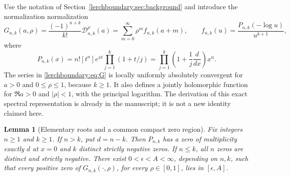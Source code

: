 \documentclass[11pt,a4paper]{article}
\newtheorem{lemma}[theorem]{Lemma}
\theoremstyle{definition}
\theoremstyle{remark}
\numberwithin{equation}{section}
\begin{document}
Use the notation of Section~\ref{lerchboundary:sec:background} and introduce the
normalization
normalization
\begin{equation}\label{lerchboundary:eq:G}
 G_{n,k}(a,\rho)=\frac{(-1)^{n+k}}{k!}\mathcal D_{n,k}^{\rho}(a)
 =\sum_{m=0}^{\infty}\rho^m f_{n,k}(a+m),\qquad
 f_{n,k}(u)=\frac{P_{n,k}(-\log u)}{u^{k+1}},
\end{equation}
where
\begin{equation}\label{lerchboundary:eq:P}
 P_{n,k}(x)=n![t^n]e^{xt}\prod_{j=1}^k(1+t/j)
 =\prod_{j=1}^k\left(1+\frac1j\frac{d}{dx}\right)x^n.
\end{equation}
The series in \eqref{lerchboundary:eq:G} is locally uniformly absolutely
convergent for $a>0$ and $0\leq\rho\leq1$, because $k\geq1$.
It also defines a jointly holomorphic function for $\Re a>0$ and
$|\rho|<1$, with the principal logarithm. The derivation of this exact
spectral representation is already in the manuscript; it is not a new
identity claimed here.

\begin{lemma}[Elementary roots and a common compact zero region]
\label{lerchboundary:lem:roots}
Fix integers $n\geq1$ and $k\geq1$.
If $n>k$, put $d=n-k$. Then $P_{n,k}$ has a zero of multiplicity exactly
$d$ at $x=0$ and $k$ distinct strictly negative zeros. If $n\leq k$, all
$n$ zeros are distinct and strictly negative.
There exist $0<\epsilon<A<\infty$, depending on $n,k$, such that every
positive zero of $G_{n,k}(\cdot,\rho)$, for every $\rho\in[0,1]$, lies
in $[\epsilon,A]$.
\end{lemma}
\end{document}
